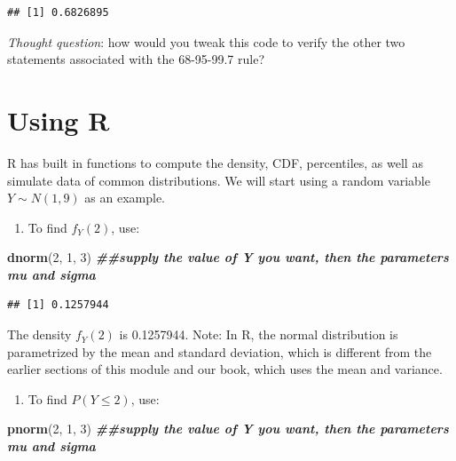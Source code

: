 \documentclass[
]{book}
\newenvironment{Shaded}{\begin{snugshade}}{\end{snugshade}}
\newcommand{\DecValTok}[1]{\textcolor[rgb]{0.00,0.00,0.81}{#1}}
\newcommand{\DocumentationTok}[1]{\textcolor[rgb]{0.56,0.35,0.01}{\textbf{\textit{#1}}}}
\newcommand{\FunctionTok}[1]{\textcolor[rgb]{0.13,0.29,0.53}{\textbf{#1}}}
\newcommand{\NormalTok}[1]{#1}
\providecommand{\tightlist}{%
  \setlength{\itemsep}{0pt}\setlength{\parskip}{0pt}}
\begin{document}
\begin{verbatim}
## [1] 0.6826895
\end{verbatim}

\emph{Thought question}: how would you tweak this code to verify the other two statements associated with the 68-95-99.7 rule?

\section{Using R}\label{using-r}

R has built in functions to compute the density, CDF, percentiles, as well as simulate data of common distributions. We will start using a random variable \(Y \sim N(1, 9)\) as an example.

\begin{enumerate}
\def\labelenumi{\arabic{enumi}.}
\tightlist
\item
  To find \(f_Y(2)\), use:
\end{enumerate}

\begin{Shaded}
\begin{Highlighting}[]
\FunctionTok{dnorm}\NormalTok{(}\DecValTok{2}\NormalTok{, }\DecValTok{1}\NormalTok{, }\DecValTok{3}\NormalTok{) }\DocumentationTok{\#\#supply the value of Y you want, then the parameters mu and sigma}
\end{Highlighting}
\end{Shaded}

\begin{verbatim}
## [1] 0.1257944
\end{verbatim}

The density \(f_Y(2)\) is 0.1257944. Note: In R, the normal distribution is parametrized by the mean and standard deviation, which is different from the earlier sections of this module and our book, which uses the mean and variance.

\begin{enumerate}
\def\labelenumi{\arabic{enumi}.}
\setcounter{enumi}{1}
\tightlist
\item
  To find \(P(Y \leq 2)\), use:
\end{enumerate}

\begin{Shaded}
\begin{Highlighting}[]
\FunctionTok{pnorm}\NormalTok{(}\DecValTok{2}\NormalTok{, }\DecValTok{1}\NormalTok{, }\DecValTok{3}\NormalTok{) }\DocumentationTok{\#\#supply the value of Y you want, then the parameters mu and sigma}
\end{Highlighting}
\end{Shaded}
\end{document}
